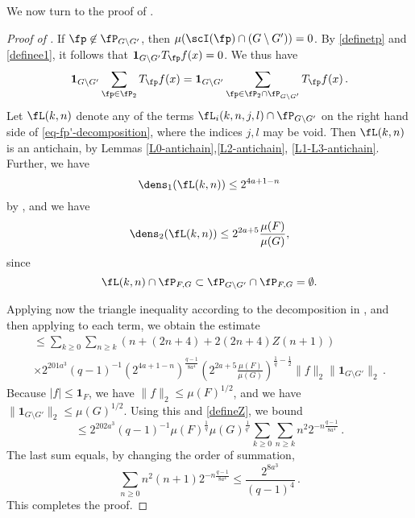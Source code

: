We now turn to the proof of .
\begin{proof}[Proof of ]
    If $\fp \not\in \fP_{G \setminus G'}$, then $\mu(\scI(\fp) \cap (G \setminus G')) = 0$. By \eqref{definetp} and \eqref{definee1}, it follows that
    $\mathbf{1}_{G \setminus G'} T_{\fp}f(x) = 0$. We thus have
    $$
        \mathbf{1}_{G\setminus G'} \sum_{\fp \in \fP_2} T_{\fp}f(x) = \mathbf{1}_{G\setminus G'} \sum_{\fp \in \fP_2 \cap \fP_{G \setminus G'}} T_{\fp}f(x)\,.
    $$
    Let $\fL(k,n)$ denote any of the terms $\fL_i(k,n,j,l) \cap \fP_{G \setminus G'}$ on the right hand side of \eqref{eq-fp'-decomposition}, where the indices $j, l$ may be void. Then $\fL(k,n)$ is an antichain, by Lemmas \ref{L0-antichain},\ref{L2-antichain}, \ref{L1-L3-antichain}. Further, we have
    \begin{equation*}
    \dens_1(\fL(k,n)) \le 2^{4a+1 - n}
    \end{equation*}
    by , and we have
    \begin{equation*}
     \dens_2(\fL(k,n)) \le 2^{2a+5} \frac{\mu(F)}{\mu(G)},
     \end{equation*}
     since
     \begin{equation*}
     \fL(k,n) \cap \fP_{F,G} \subset \fP_{G \setminus G'} \cap \fP_{F, G} = \emptyset.
     \end{equation*}

    Applying now the triangle inequality according to the decomposition in , and then applying  to each term, we obtain the estimate
    \begin{multline*}
        \le \sum_{k \ge 0} \sum_{n \ge k} (n + (2n+4) + 2(2n+4) Z(n+1)) \\
        \times 2^{201a^3}(q-1)^{-1} (2^{4a+1-n})^{\frac{q-1}{8a^4}} (2^{2a+5} \frac{\mu(F)}{\mu(G)})^{\frac{1}{q} - \frac{1}{2}} \|f\|_2\|\mathbf{1}_{G\setminus G'}\|_2\,.
    \end{multline*}
    Because $|f| \le \mathbf{1}_F$, we have $\|f\|_2 \le \mu(F)^{1/2}$, and we have $\|\mathbf{1}_{G\setminus G'}\|_2 \le \mu(G)^{1/2}$. Using this and \eqref{defineZ}, we bound
    $$
        \le 2^{202a^3} (q - 1)^{-1} \mu(F)^{\frac{1}{q}} \mu(G)^{\frac{1}{q'}} \sum_{k \ge 0} \sum_{n \ge k} n^2 2^{-n\frac{q-1}{8a^4}}\,.
    $$
    The last sum equals, by changing the order of summation,
    $$
        \sum_{n \ge 0} n^2(n+1) 2^{-n\frac{q-1}{8a^4}} \le \frac{2^{8a^3}}{(q-1)^4}\,.
    $$
    This completes the proof.
\end{proof}

